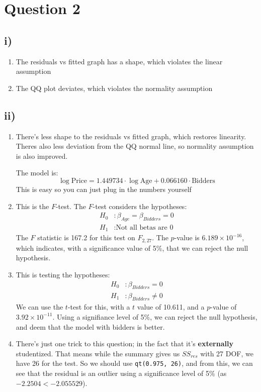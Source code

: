 \documentclass{article}
\begin{document}
\section*{Question 2}
\subsection*{i)}
\begin{enumerate}
    \item The residuals vs fitted graph has a shape, which violates the linear assumption
    \item The QQ plot deviates, which violates the normality assumption
\end{enumerate}
\subsection*{ii)}
\begin{enumerate}
    \item There's less shape to the residuals vs fitted graph, which restores linearity. Theres also less deviation 
    from the QQ normal line, so normality assumption is also improved. 

    The model is:
    $$ \log\text{Price} = 1.449734 \cdot \log \text{Age} + 0.066160 \cdot \text{Bidders}$$
    This is easy so you can just plug in the numbers yourself
    \item This is the $F$-test. The $F$-test considers the hypotheses:
    \begin{align*}
        H_0 &: \beta_{Age} = \beta_{Bidders} = 0 \\ 
        H_1 &: \text{Not all betas are 0}
    \end{align*}
    The $F$ statistic is 167.2 for this test on $F_{2, 27}$. The $p$-value is $6.189 \times 10^{-16}$, which indicates,
    with a significance value of 5\%, that we can reject the null hypothesis.

    \item This is testing the hypotheses:
    \begin{align*}
        H_0 &: \beta_{Bidders} = 0 \\ 
        H_1 &: \beta_{Bidders} \ne 0
    \end{align*}
    We can use the $t$-test for this, with a $t$ value of 10.611, and a $p$-value of $3.92 \times 10^{-11}$. Using a 
    signifiance level of 5\%, we can reject the null hypothesis, and deem that the model with bidders is better.

    \item There's just one trick to this question; in the fact that it's \textbf{externally} studentized. That means 
    while the summary gives us $SS_{res}$ with 27 DOF, we have 26 for the test. So we should use \verb|qt(0.975, 26)|,
    and from this, we can see that the residual is an outlier using a significance level of 5\% (as $-2.2504 < -2.055529$).
\end{enumerate}
\newpage
\end{document}

